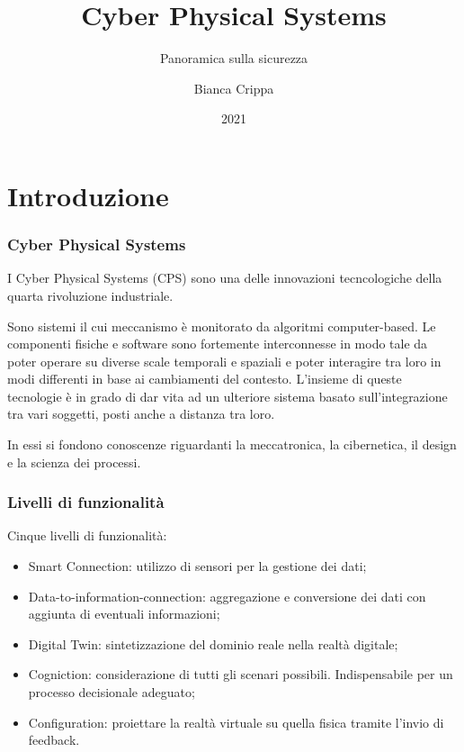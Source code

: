 \documentclass{beamer}
\title{Cyber Physical Systems}
\subtitle{Panoramica sulla sicurezza}
\author{Bianca Crippa}
\date{2021}
\begin{document}
\frame{\titlepage}


\section{Introduzione}

\begin{frame}
    \frametitle{Cyber Physical Systems}
    I Cyber Physical Systems (CPS) sono una delle innovazioni tecncologiche della quarta rivoluzione industriale.
    
    Sono sistemi il cui meccanismo è monitorato da algoritmi computer-based. 
    Le componenti fisiche e software sono fortemente interconnesse in modo tale da poter operare su diverse scale temporali e spaziali e poter 
    interagire tra loro in modi differenti in base ai cambiamenti del contesto. L'insieme di queste tecnologie è in grado di dar vita ad un ulteriore 
    sistema basato sull'integrazione tra vari soggetti, posti anche a distanza tra loro.
    
    In essi si fondono conoscenze riguardanti la meccatronica, la cibernetica, il design e la scienza dei processi.
    
\end{frame}

\begin{frame}
\frametitle{Livelli di funzionalità}

    Cinque livelli di funzionalità:
    \begin{itemize}
        \item Smart Connection: utilizzo di sensori per la gestione dei dati;
        \item Data-to-information-connection: aggregazione e conversione dei dati con aggiunta di eventuali informazioni;
        \item Digital Twin: sintetizzazione del dominio reale nella realtà digitale;
        \item Cogniction: considerazione di tutti gli scenari possibili. Indispensabile per un processo decisionale adeguato;
        \item Configuration: proiettare la realtà virtuale su quella fisica tramite l'invio di feedback.
    \end{itemize}
    
\end{frame}
\end{document}
